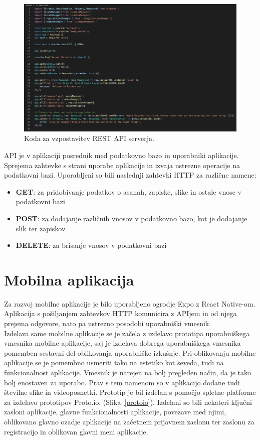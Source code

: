\documentclass[a4paper, 12pt]{book}
\begin{document}
\begin{figure}[htbp]
\begin{center}
\includegraphics[scale=0.33]{server.jpg} 
\end{center}
\caption{Koda za vzpostavitev REST API serverja.}
\label{server}
\end{figure}

API je v aplikaciji posrednik med podatkovno bazo in uporabniki aplikacije. Sprejema zahtevke s strani uporabe aplikacije in izvaja ustrezne operacije na podatkovni bazi. Uporabljeni so bili naslednji zahtevki HTTP za različne namene:

 \begin{itemize}
  \item \textbf{GET}: za pridobivanje podatkov o asanah, zapiske, slike in ostale vnose v podatkovni bazi
  \item \textbf{POST}: za dodajanje različnih vnosov v podatkovno bazo, kot je dodajanje slik ter zapiskov
  \item \textbf{DELETE}: za brisanje vnosov v podatkovni bazi
\end{itemize}

\section{Mobilna aplikacija}
Za razvoj mobilne aplikacije je bilo uporabljeno ogrodje Expo z React Native-om. Aplikacija s pošiljanjem zahtevkov HTTP komunicira z APIjem in od njega prejema odgovore, nato pa ustrezno posodobi uporabniški vmesnik.\\

Izdelava same mobilne aplikacije se je začela z izdelavo prototipa uporabniškega vmesnika mobilne aplikacije, saj je izdelava dobrega uporabniškega vmesnika pomemben sestavni del oblikovanja uporabniške izkušnje. Pri oblikovanju mobilne aplikacije se je pomembno usmeriti tako na estetiko kot seveda, tudi na funkcionalnost aplikacije. Vmesnik je narejen na bolj pregleden način, da je tako bolj enostaven za uporabo. Prav s tem namenom so v aplikacijo dodane tudi številne slike in videoposnetki.
Prototip je bil izdelan s pomočjo spletne platforme za izdelavo prototipov Proto.io, (Slika~\ref{protoio}). Izdelani so bili nekateri ključni zasloni aplikacije, glavne funkcionalnosti aplikacije, povezave med njimi, oblikovano glavno ozadje aplikacije na začetnem prijavnem zaslonu ter zaslonu za registracijo in oblikovan glavni meni aplikacije.
\end{document}
